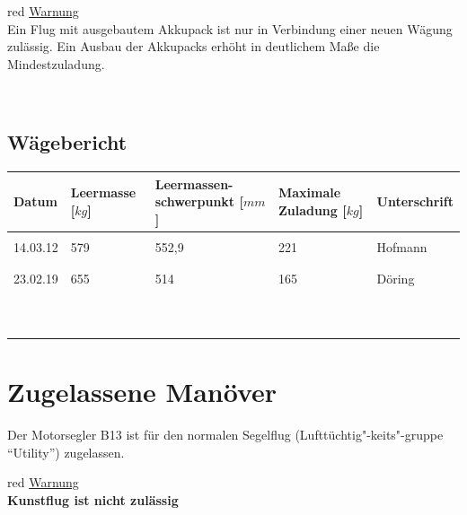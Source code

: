 \begin{color}{red}
\large{\underline{Warnung}}\\
Ein Flug mit ausgebautem Akkupack ist nur in Verbindung einer neuen Wägung zulässig. Ein Ausbau der Akkupacks erhöht in deutlichem Maße die Mindestzuladung.
\end{color}\\

\subsection{Wägebericht}

\begin{tiny}
\begin{tabular}{|m{}|m{}|m{2cm}|m{}|m{}|}
\hline
Datum & Leermasse [$\unit{kg}$] & Leermassen- schwerpunkt [$\unit{mm}$]  & Maximale Zuladung [$\unit{kg}$] & Unterschrift\\

\hline
& & & &\\
14.03.12 & 579 & 552,9 & 221 & Hofmann\\
& & & &\\
\hline
& & & &\\
23.02.19 & 655 & 514 & 165 & Döring\\
& & & &\\
\hline
& & & &\\
& & & &\\
& & & &\\
\hline
& & & &\\
& & & &\\
& & & &\\
\hline
& & & &\\
& & & &\\
& & & &\\
\hline

\end{tabular}
\end{tiny}


\section{Zugelassene Manöver}
Der Motorsegler B13 ist für den normalen Segelflug (Lufttüchtig"-keits"-gruppe "`Utility"') zugelassen.\\
\newline
\begin{color}{red}
\large{\underline{Warnung}}\\
\textbf{Kunstflug ist nicht zulässig}
\end{color}

